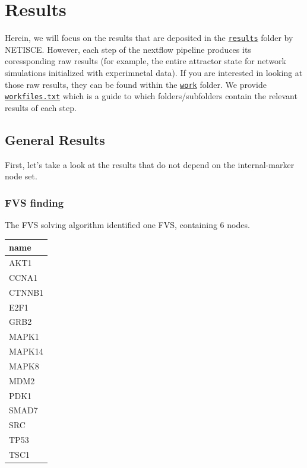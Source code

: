 \documentclass[
]{book}
\begin{document}
\hypertarget{results-2}{%
\section{Results}\label{results-2}}

Herein, we will focus on the results that are deposited in the \href{https://github.com/VeraLiconaResearchGroup/Netisce/tree/main/ipsc_validation/results}{\texttt{results}} folder by NETISCE. However, each step of the nextflow pipeline produces its coressponding raw results (for example, the entire attractor state for network simulations initialized with experimnetal data). If you are interested in looking at those raw results, they can be found within the \href{https://github.com/VeraLiconaResearchGroup/Netisce/tree/main/ipsc_validation/work}{\texttt{work}} folder. We provide \href{https://github.com/VeraLiconaResearchGroup/Netisce/blob/main/ipsc_validation/workfiles.txt}{\texttt{workfiles.txt}} which is a guide to which folders/subfolders contain the relevant results of each step.

\hypertarget{general-results-1}{%
\subsection{General Results}\label{general-results-1}}

First, let's take a look at the results that do not depend on the internal-marker node set.

\hypertarget{section-id}{%
\subsubsection*{FVS finding}\label{section-id}}

The FVS solving algorithm identified one FVS, containing 6 nodes.

\begin{tabular}{l}
\hline
name\\
\hline
AKT1\\
\hline
CCNA1\\
\hline
CTNNB1\\
\hline
E2F1\\
\hline
GRB2\\
\hline
MAPK1\\
\hline
MAPK14\\
\hline
MAPK8\\
\hline
MDM2\\
\hline
PDK1\\
\hline
SMAD7\\
\hline
SRC\\
\hline
TP53\\
\hline
TSC1\\
\hline
\end{tabular}
\end{document}
